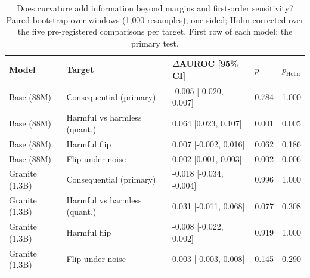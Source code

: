 \begin{table}
\caption{Does curvature add information beyond margins and first-order sensitivity? Paired bootstrap over windows (1{,}000 resamples), one-sided; Holm-corrected over the five pre-registered comparisons per target. First row of each model: the primary test.}
\label{tab:sig}
\begin{tabular}{lllll}
\toprule
Model & Target & $\Delta$AUROC [95\% CI] & $p$ & $p_{\mathrm{Holm}}$ \\
\midrule
Base (88M) & Consequential (primary) & -0.005 \scriptsize{[-0.020, 0.007]} & 0.784 & 1.000 \\
Base (88M) & Harmful vs harmless (quant.) & 0.064 \scriptsize{[0.023, 0.107]} & 0.001 & 0.005 \\
Base (88M) & Harmful flip & 0.007 \scriptsize{[-0.002, 0.016]} & 0.062 & 0.186 \\
Base (88M) & Flip under noise & 0.002 \scriptsize{[0.001, 0.003]} & 0.002 & 0.006 \\
Granite (1.3B) & Consequential (primary) & -0.018 \scriptsize{[-0.034, -0.004]} & 0.996 & 1.000 \\
Granite (1.3B) & Harmful vs harmless (quant.) & 0.031 \scriptsize{[-0.011, 0.068]} & 0.077 & 0.308 \\
Granite (1.3B) & Harmful flip & -0.008 \scriptsize{[-0.022, 0.002]} & 0.919 & 1.000 \\
Granite (1.3B) & Flip under noise & 0.003 \scriptsize{[-0.003, 0.008]} & 0.145 & 0.290 \\
\bottomrule
\end{tabular}
\end{table}
